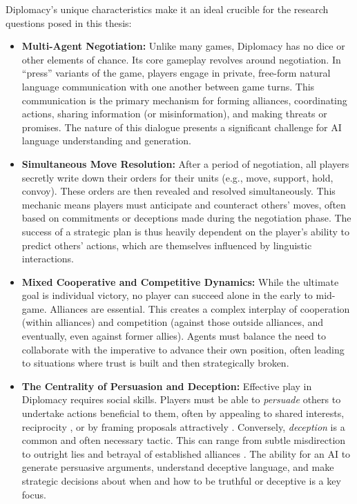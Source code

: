 \documentclass[oneside]{memoir}
\begin{document}
Diplomacy's unique characteristics make it an ideal crucible for the research questions posed in this thesis:
\begin{itemize}
    \item \textbf{Multi-Agent Negotiation:} Unlike many games, Diplomacy has no dice or other elements of chance. Its core gameplay revolves around negotiation. In ``press'' variants of the game, players engage in private, free-form natural language communication with one another between game turns. This communication is the primary mechanism for forming alliances, coordinating actions, sharing information (or misinformation), and making threats or promises. The nature of this dialogue presents a significant challenge for AI language understanding and generation.
    \item \textbf{Simultaneous Move Resolution:} After a period of negotiation, all players secretly write down their orders for their units (e.g., move, support, hold, convoy). These orders are then revealed and resolved simultaneously. This mechanic means players must anticipate and counteract others' moves, often based on commitments or deceptions made during the negotiation phase. The success of a strategic plan is thus heavily dependent on the player's ability to predict others' actions, which are themselves influenced by linguistic interactions.
    \item \textbf{Mixed Cooperative and Competitive Dynamics:} While the ultimate goal is individual victory, no player can succeed alone in the early to mid-game. Alliances are essential. This creates a complex interplay of cooperation (within alliances) and competition (against those outside alliances, and eventually, even against former allies). Agents must balance the need to collaborate with the imperative to advance their own position, often leading to situations where trust is built and then strategically broken.
    \item \textbf{The Centrality of Persuasion and Deception:} Effective play in Diplomacy requires social skills. Players must be able to \textit{persuade} others to undertake actions beneficial to them, often by appealing to shared interests, reciprocity \citep{kramar2022negotiation}, or by framing proposals attractively \citep{Cialdini1993InfluenceTP}. Conversely, \textit{deception} is a common and often necessary tactic. This can range from subtle misdirection to outright lies and betrayal of established alliances \citep{peskov2020takes}. The ability for an AI to generate persuasive arguments, understand deceptive language, and make strategic decisions about when and how to be truthful or deceptive is a key focus.

\end{itemize}
\end{document}
